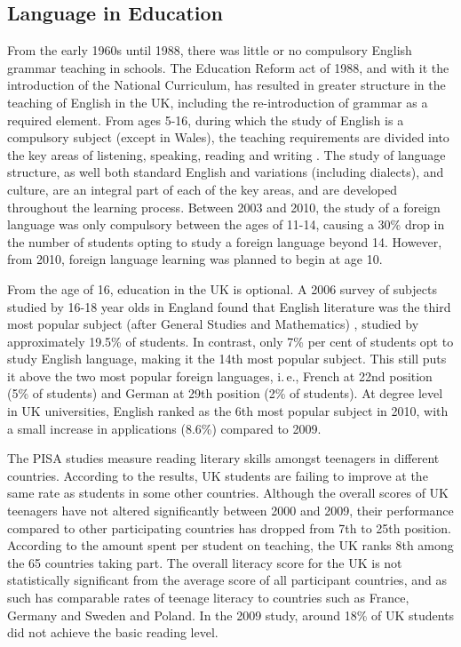 \documentclass[]{../../metanetpaper}
\begin{document}
\begin{multicols}{2}
\subsection{Language in Education}

From the early 1960s until 1988, there was little or no compulsory English grammar teaching in schools. The Education Reform act of 1988, and with it the introduction of the National Curriculum, has resulted in greater structure in the teaching of English in the UK, including the re-introduction of grammar as a required element. From ages 5-16, during which the study of English is a compulsory subject (except in Wales), the teaching requirements are divided into the key areas of listening, speaking, reading and writing \cite{curric}. The study of language structure, as well both standard English and variations (including dialects), and culture, are an integral part of each of the key areas, and are developed throughout the learning process. Between 2003 and 2010, the study of a foreign language was only compulsory between the ages of 11-14, causing a 30\% drop in the number of students opting to study a foreign language beyond 14. However, from 2010, foreign language learning was planned to begin at age 10.
   
From the age of 16, education in the UK is optional. A 2006 survey of subjects studied by 16-18 year olds in England found that English literature was the third most popular subject (after General Studies and Mathematics) \cite{camb}, studied by approximately 19.5\% of students. In contrast, only 7\% per cent of students opt to study English language, making it the 14th most popular subject. This still puts it above the two most popular foreign languages, i.\,e., French at 22nd position (5\% of students) and German at 29th position (2\% of students). At degree level in UK universities, English ranked as the 6th most popular subject in 2010, with a small increase in applications (8.6\%) compared to 2009.

The PISA studies \cite{pisa} measure reading literary skills amongst teenagers in different countries. According to the results, UK students are failing to improve at the same rate as students in some other countries. Although the overall scores of UK teenagers have not altered significantly between 2000 and 2009, their performance compared to other participating countries has dropped from 7th to 25th position. According to the amount spent per student on teaching, the UK ranks 8th among the 65 countries taking part. The overall literacy score for the UK  is not statistically significant from the average score of all participant countries, and as such has comparable rates of teenage literacy to countries such as France, Germany and Sweden and Poland. In the 2009 study, around 18\% of UK students did not achieve the basic reading level.    


\end{multicols}
\end{document}

